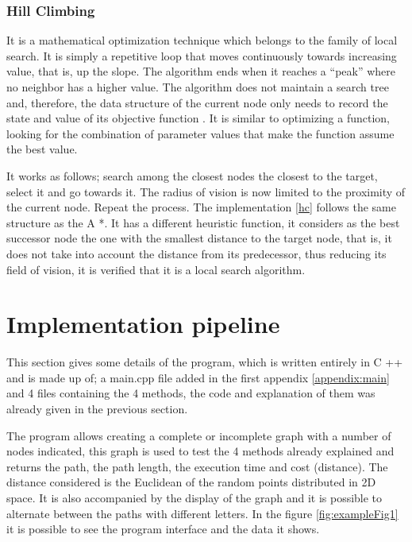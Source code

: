 \documentclass[11pt]{article}
\begin{document}
        \subsubsection{Hill Climbing}
        It is a mathematical optimization technique which belongs to the family of local search. It is simply a repetitive loop that moves continuously towards increasing value, that is, up the slope. The algorithm ends when it reaches a “peak” where no neighbor has a higher value. The algorithm does not maintain a search tree and, therefore, the data structure of the current node only needs to record the state and value of its objective function \cite{russell2004inteligencia}. It is similar to optimizing a function, looking for the combination of parameter values that make the function assume the best value.
        
        It works as follows; search among the closest nodes the closest to the target, select it and go towards it. The radius of vision is now limited to the proximity of the current node. Repeat the process. 
        The implementation \ref{hc} follows the same structure as the A *. It has a different heuristic function, it considers as the best successor node the one with the smallest distance to the target node, that is, it does not take into account the distance from its predecessor, thus reducing its field of vision, it is verified that it is a local search algorithm.
        

\section{Implementation pipeline}
This section gives some details of the program, which is written entirely in C ++ and is made up of; a main.cpp file added in the first appendix \ref{appendix:main} and 4 files containing the 4 methods, the code and explanation of them was already given in the previous section.

The program allows creating a complete or incomplete graph with a number of nodes indicated, this graph is used to test the 4 methods already explained and returns the path, the path length, the execution time and cost (distance). The distance considered is the Euclidean of the random points distributed in 2D space.
It is also accompanied by the display of the graph and it is possible to alternate between the paths with different letters. In the figure \ref{fig:exampleFig1} it is possible to see the program interface and the data it shows.
\end{document}
